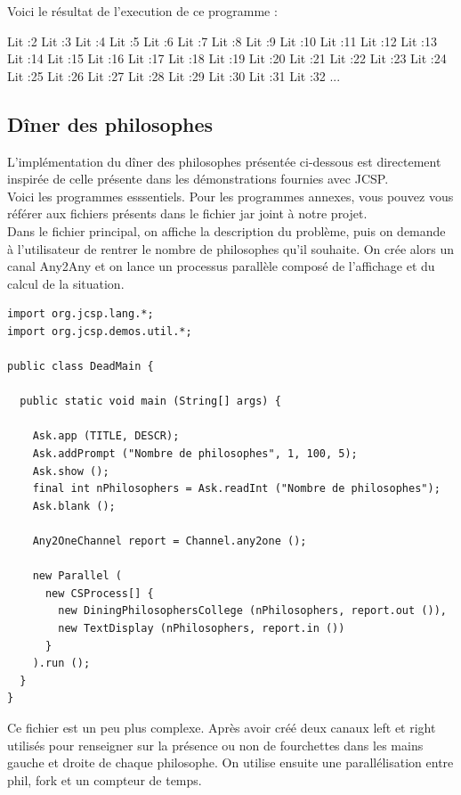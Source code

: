 \documentclass[a4paper,11pt,french]{report}
\begin{document}
Voici le résultat de l'execution de ce programme :

Lit :2
Lit :3
Lit :4
Lit :5
Lit :6
Lit :7
Lit :8
Lit :9
Lit :10
Lit :11
Lit :12
Lit :13
Lit :14
Lit :15
Lit :16
Lit :17
Lit :18
Lit :19
Lit :20
Lit :21
Lit :22
Lit :23
Lit :24
Lit :25
Lit :26
Lit :27
Lit :28
Lit :29
Lit :30
Lit :31
Lit :32
...
 
\subsection{Dîner des philosophes}

L'implémentation du dîner des philosophes présentée ci-dessous est directement inspirée de celle présente dans les démonstrations fournies avec JCSP.\\
Voici les programmes esssentiels. Pour les programmes annexes, vous pouvez vous référer aux fichiers présents dans le fichier \textsf{jar} joint à notre projet.\\

Dans le fichier principal, on affiche la description du problème, puis on demande à l'utilisateur de rentrer le nombre de philosophes qu'il souhaite. On crée alors un canal Any2Any et on lance un processus parallèle composé de l'affichage et du calcul de la situation.\\

\begin{lstlisting}[frame=trBL,title={Dîner des philosophes : DeadMain.java}]
import org.jcsp.lang.*;
import org.jcsp.demos.util.*;

public class DeadMain {

  public static void main (String[] args) {

  	Ask.app (TITLE, DESCR);
  	Ask.addPrompt ("Nombre de philosophes", 1, 100, 5);
  	Ask.show ();
  	final int nPhilosophers = Ask.readInt ("Nombre de philosophes");
  	Ask.blank ();

    Any2OneChannel report = Channel.any2one ();

    new Parallel (
      new CSProcess[] {
        new DiningPhilosophersCollege (nPhilosophers, report.out ()),
        new TextDisplay (nPhilosophers, report.in ())
      }
    ).run ();
  }
}
\end{lstlisting}

Ce fichier est un peu plus complexe. Après avoir créé deux canaux left et right utilisés pour renseigner sur la présence ou non de fourchettes dans les mains gauche et droite de chaque philosophe. On utilise ensuite une parallélisation entre phil, fork et un compteur de temps.
\end{document}
